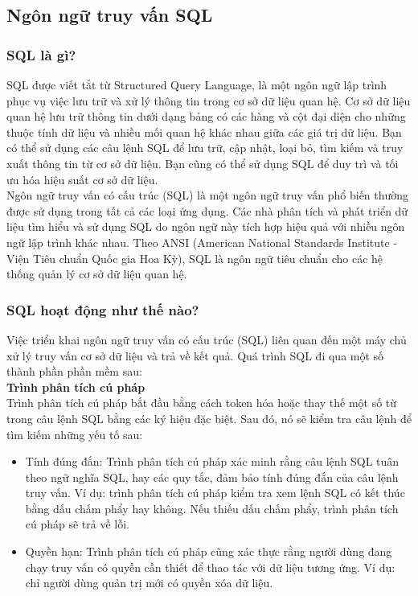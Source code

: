 \subsection{Ngôn ngữ truy vấn SQL}
\subsubsection{SQL là gì?}
\hspace*{0.5cm} SQL được viết tắt từ Structured Query Language, là một ngôn ngữ lập trình phục vụ việc lưu trữ và xử lý thông tin trong cơ sở dữ liệu quan hệ. Cơ sở dữ liệu quan hệ lưu trữ thông tin dưới dạng bảng có các hàng và cột đại diện cho những thuộc tính dữ liệu và nhiều mối quan hệ khác nhau giữa các giá trị dữ liệu. Bạn có thể sử dụng các câu lệnh SQL để lưu trữ, cập nhật, loại bỏ, tìm kiếm và truy xuất thông tin từ cơ sở dữ liệu. Bạn cũng có thể sử dụng SQL để duy trì và tối ưu hóa hiệu suất cơ sở dữ liệu.\\
\hspace*{0.5cm} Ngôn ngữ truy vấn có cấu trúc (SQL) là một ngôn ngữ truy vấn phổ biến thường được sử dụng trong tất cả các loại ứng dụng. Các nhà phân tích và phát triển dữ liệu tìm hiểu và sử dụng SQL do ngôn ngữ này tích hợp hiệu quả với nhiều ngôn ngữ lập trình khác nhau. Theo ANSI (American National Standards Institute - Viện Tiêu chuẩn Quốc gia Hoa Kỳ), SQL là ngôn ngữ tiêu chuẩn cho các hệ thống quản lý cơ sở dữ liệu quan hệ.
\subsubsection{SQL hoạt động như thế nào?}
\hspace*{0.5cm} Việc triển khai ngôn ngữ truy vấn có cấu trúc (SQL) liên quan đến một máy chủ xử lý truy vấn cơ sở dữ liệu và trả về kết quả. Quá trình SQL đi qua một số thành phần phần mềm sau:\\
\hspace*{0.5cm}\textbf{Trình phân tích cú pháp}\\
\hspace*{0.5cm}Trình phân tích cú pháp bắt đầu bằng cách token hóa hoặc thay thế một số từ trong câu lệnh SQL bằng các ký hiệu đặc biệt. Sau đó, nó sẽ kiểm tra câu lệnh để tìm kiếm những yếu tố sau:
\begin{itemize}
	\item Tính đúng đắn: Trình phân tích cú pháp xác minh rằng câu lệnh SQL tuân theo ngữ nghĩa SQL, hay các quy tắc, đảm bảo tính đúng đắn của câu lệnh truy vấn. Ví dụ: trình phân tích cú pháp kiểm tra xem lệnh SQL có kết thúc bằng dấu chấm phẩy hay không. Nếu thiếu dấu chấm phẩy, trình phân tích cú pháp sẽ trả về lỗi.
	\item Quyền hạn: Trình phân tích cú pháp cũng xác thực rằng người dùng đang chạy truy vấn có quyền cần thiết để thao tác với dữ liệu tương ứng. Ví dụ: chỉ người dùng quản trị mới có quyền xóa dữ liệu.
\end{itemize}

